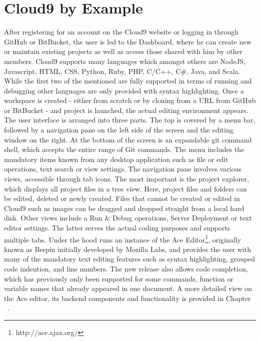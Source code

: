 \section{Cloud9 by Example}
\label{sec:Motivation}


After registering for an account on the Cloud9 website or logging in through GitHub or BitBucket, the user is led to the Dashboard, where he can create new or maintain existing projects as well as access those shared with him by other members. Cloud9 supports many languages which amongst others are NodeJS, Javascript, HTML, CSS, Python, Ruby, PHP, C/C++, C\#, Java, and Scala. While the first two of the mentioned are fully supported in terms of running and debugging other languages are only provided with syntax highlighting. Once a workspace is created - either from scratch or by cloning from a URL from GitHub or BitBucket - and project is launched, the actual editing environment appears. The user interface is arranged into three parts. The top is covered by a menu bar, followed by a navigation pane on the left side of the screen and the editing window on the right. At the bottom of the screen is an expandable git command shell, which accepts the entire range of Git commands. The menu includes the mandatory items known from any desktop application such as file or edit operations, text search or view settings. The navigation pane involves various views, accessible through tab icons. The most important is the project explorer, which displays all project files in a tree view. Here, project files and folders can be edited, deleted or newly created. Files that cannot be created or edited in Cloud9 such as images can be dragged and dropped straight from a local hard disk. Other views include a Run \& Debug operations, Server Deployment or text editor settings. The latter serves the actual coding purposes and supports multiple tabs. Under the hood runs an instance of the Ace Editor\footnote{http://ace.ajax.org/}, originally known as Bespin initially developed by Mozilla Labs, and provides the user with many of the mandatory text editing features such as syntax highlighting, grouped code indention, and line numbers. The new release also allows code completion, which has previously only been supported for some commands, function or variable names that already appeared in one document. A more detailed view on the Ace editor, its backend components and functionality is provided in Chapter ~\needcite. 

